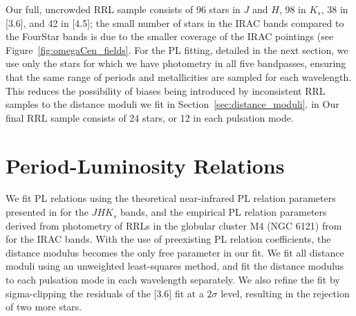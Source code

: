 \documentclass[a4paper,fleqn,usenatbib]{mnras}
\begin{document}
Our full, uncrowded RRL sample consists of 96 stars in $J$ and $H$, 98 in $K_s$, 38 in [3.6], and 42 in [4.5]; the small number of stars in the IRAC bands compared to the FourStar bands is due to the smaller coverage of the IRAC pointings (see Figure~\ref{fig:omegaCen_fields}. For the PL fitting, detailed in the next section, we use only the stars for which we have photometry in all five bandpasses, ensuring that the same range of periods and metallicities are sampled for each wavelength. This reduces the possibility of biases being introduced by inconsistent RRL samples to the distance moduli we fit in Section~\ref{sec:distance_moduli}. in Our final RRL sample consists of 24 stars, or 12 in each pulsation mode.

\section{Period-Luminosity Relations}
\label{sec:pl_relation}

We fit PL relations using the theoretical near-infrared PL relation parameters presented in \citet{2015ApJ...808...50M} for the $JHK_s$ bands, and the empirical PL relation parameters derived from photometry of RRLs in the globular cluster M4 (NGC 6121) from \citet{2015ApJ...808...11N} for the IRAC bands. With the use of preexisting PL relation coefficients, the distance modulus becomes the only free parameter in our fit. We fit all distance moduli using an unweighted least-squares method, and fit the distance modulus to each pulsation mode in each wavelength separately. We also refine the fit by sigma-clipping the residuals of the [3.6] fit at a $2\sigma$ level, resulting in the rejection of two more stars.
\end{document}
